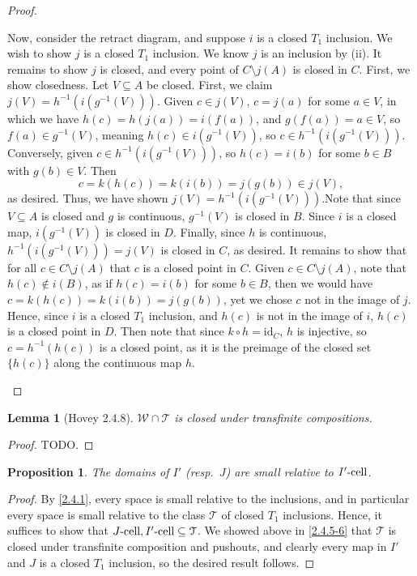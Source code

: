 \documentclass{amsart}
\theoremstyle{plain}
\newtheorem{proposition}[theorem]{Proposition}
\newtheorem{lemma}[theorem]{Lemma}
\theoremstyle{definition}
\newcommand{\sseq}{\subseteq}
\newcommand{\0}{\mathbf{0}}
\newcommand{\id}{\mathrm{id}}
\newcommand{\cT}{\mathcal T}
\newcommand{\cW}{\mathcal W}
\renewcommand{\(}{\left(}
\renewcommand{\)}{\right)}
\newcommand{\cell}{\text-\mathrm{cell}}
\begin{document}
\begin{proof}
\begin{enumerate}[label=(\roman*),listparindent=\parindent,parsep=0pt]
    Now, consider the retract diagram, and suppose $i$ is a closed $T_1$ inclusion. We wish to show $j$ is a closed $T_1$ inclusion. We know $j$ is an inclusion by (ii). It remains to show $j$ is closed, and every point of $C\setminus j(A)$ is closed in $C$. First, we show closedness. Let $V\sseq A$ be closed. First, we claim $j(V)=h^{-1}(i(g^{-1}(V)))$. Given $c\in j(V)$, $c=j(a)$ for some $a\in V$, in which we have $h(c)=h(j(a))=i(f(a))$, and $g(f(a))=a\in V$, so $f(a)\in g^{-1}(V)$, meaning $h(c)\in i(g^{-1}(V))$, so $c\in h^{-1}(i(g^{-1}(V)))$. Conversely, given $c\in h^{-1}(i(g^{-1}(V)))$, so $h(c)=i(b)$ for some $b\in B$ with $g(b)\in V$. Then
    \[c=k(h(c))=k(i(b))=j(g(b))\in j(V),\]
    as desired. Thus, we have shown $j(V)=h^{-1}(i(g^{-1}(V)))$.Note that since $V\sseq A$ is closed and $g$ is continuous, $g^{-1}(V)$ is closed in $B$. Since $i$ is a closed map, $i(g^{-1}(V))$ is closed in $D$. Finally, since $h$ is continuous, $h^{-1}(i(g^{-1}(V)))=j(V)$ is closed in $C$, as desired. It remains to show that for all $c\in C\setminus j(A)$ that $c$ is a closed point in $C$. Given $c\in C\setminus j(A)$, note that $h(c)\notin i(B)$, as if $h(c)=i(b)$ for some $b\in B$, then we would have $c=k(h(c))=k(i(b))=j(g(b))$, yet we chose $c$ not in the image of $j$. Hence, since $i$ is a closed $T_1$ inclusion, and $h(c)$ is not in the image of $i$, $h(c)$ is a closed point in $D$. Then note that since $k\circ h=\id_C$, $h$ is injective, so $c=h^{-1}(h(c))$ is a closed point, as it is the preimage of the closed set $\{h(c)\}$ along the continuous map $h$.\qedhere
  \end{enumerate}
\end{proof}

\begin{lemma}[Hovey 2.4.8]\label{2.4.8}
  $\cW\cap\cT$ is closed under transfinite compositions.
\end{lemma}
\begin{proof}
  \color{red}TODO.
\end{proof}

\begin{proposition}\label{domains_of_I'/J_small_rel_I'-cell/J-cell}
  The domains of $I'$ (resp.\ $J$) are small relative to $I'\cell$.
\end{proposition}
\begin{proof}
  By \autoref{2.4.1}, every space is small relative to the inclusions, and in particular every space is small relative to the class $\cT$ of closed $T_1$ inclusions. Hence, it suffices to show that $J\cell,I'\cell\sseq\cT$. We showed above in \autoref{2.4.5-6} that $\cT$ is closed under transfinite composition and pushouts, and clearly every map in $I'$ and $J$ is a closed $T_1$ inclusion, so the desired result follows.
\end{proof}
\end{document}
